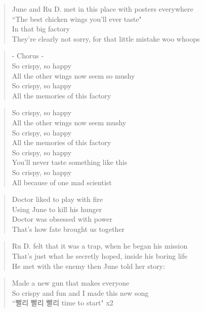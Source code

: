 
\begin{verse}
June and Ru D. met in this place with posters everywhere\\
``The best chicken wings you'll ever taste"\\
In that big factory \\
They're clearly not sorry, for that little mistake woo whoops
\end{verse}

\begin{verse}
- Chorus -\\
So crispy, so happy\\
All the other wings now seem so mushy\\
So crispy, so happy\\
All the memories of this factory
\end{verse}

\begin{verse}
So crispy, so happy\\
All the other wings now seem mushy\\
So crispy, so happy\\
All the memories of this factory\\
So crispy, so happy\\
You'll never taste something like this\\
So crispy, so happy\\
All because of one mad scientist
\end{verse}

\begin{verse}
Doctor liked to play with fire\\
Using June to kill his hunger\\
Doctor was obsessed with power\\
That's how fate brought us together
\end{verse}

\begin{verse}
Ru D. felt that it was a trap, when he began his mission\\
That's just what he secretly hoped, inside his boring life\\
He met with the enemy then June told her story:
\end{verse}

\begin{verse}
Made a new gun that makes everyone\\
So crispy and fun and I made this new song\\
``빨리 빨리 빨리 time to start" x2
\end{verse}

